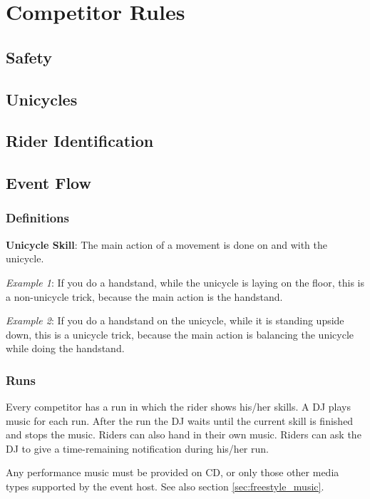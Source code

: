 \chapter{Competitor Rules}

\section{Safety}
\section{Unicycles}
\section{Rider Identification}
\section{Event Flow}

\subsection{Definitions}
\textbf{Unicycle Skill}: The main action of a movement is done on and with the unicycle.

\emph{Example 1}: If you do a handstand, while the unicycle is laying on the floor, this is a non-unicycle trick, because the main action is the handstand.

\emph{Example 2}: If you do a handstand on the unicycle, while it is standing upside down, this is a unicycle trick, because the main action is balancing the unicycle while doing the handstand.

\subsection{Runs}
Every competitor has a run in which the rider shows his/her skills.
A DJ plays music for each run.
After the run the DJ waits until the current skill is finished and stops the music.
Riders can also hand in their own music.
Riders can ask the DJ to give a time-remaining notification during his/her run.

Any performance music must be provided on CD, or only those other media types supported by the event host.
See also section \ref{sec:freestyle_music}.

